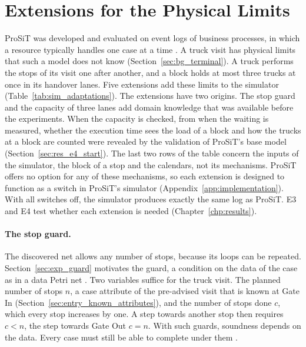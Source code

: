 \section{Extensions for the Physical Limits}
\label{sec:sim_adaptations}

ProSiT was developed and evaluated on event logs of business processes, in which
a resource typically handles one case at a time \cite{Vinci2026prosit}. A truck visit has physical limits that such a model does not know
(Section~\ref{sec:bg_terminal}). A truck performs the stops of its visit one after
another, and a block holds at most three trucks at once in its handover lanes. Five extensions add these
limits to the simulator (Table~\ref{tab:sim_adaptations}). The extensions have two
origins. The stop guard and the capacity of three lanes add domain knowledge that was
available before the experiments. When the capacity is checked, from when the waiting
is measured, whether the execution time sees the load of a block and how the trucks
at a block are counted were revealed by the validation of ProSiT's base model
(Section~\ref{sec:res_e4_start}). The last two rows of the table concern the inputs of
the simulator, the block of a stop and the calendars, not its mechanisms. ProSiT
offers no option for any of these mechanisms, so each extension is designed to
function as a switch in ProSiT's simulator (Appendix~\ref{app:implementation}). With
all switches off, the simulator produces exactly the same log as ProSiT. E3 and E4 test whether each extension
is needed (Chapter~\ref{chp:results}).

\paragraph{The stop guard.} The discovered net allows any number of stops, because
its loops can be repeated. Section~\ref{sec:exp_guard} motivates the guard, a
condition on the data of the case as in a data Petri net
\cite{Mannhardt2016Precision}. Two variables suffice for the truck visit. The planned number of stops $n$, a case attribute of the pre-advised
visit that is known at Gate In (Section~\ref{sec:entry_known_attributes}), and the
number of stops done $c$, which every stop increases by one. A step towards another
stop then requires $c < n$, the step towards Gate Out $c = n$. With such guards,
soundness depends on the data. Every case must still be able to complete under
them \cite{FelliDeLeoniMontali2021}.

